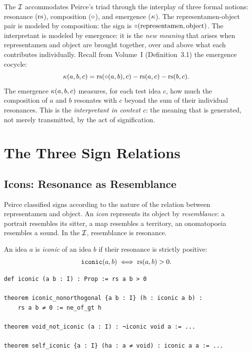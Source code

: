 The $\mathcal{I}$ accommodates Peirce's triad through the interplay of three
formal notions: resonance ($\mathrm{rs}$), composition ($\circ$), and
emergence ($\kappa$). The representamen-object pair is modeled by
composition: the sign is $\circ(\text{representamen}, \text{object})$.
The interpretant is modeled by emergence: it is the \emph{new meaning}
that arises when representamen and object are brought together, over
and above what each contributes individually. Recall from Volume~I
(Definition~3.1) the emergence cocycle:
\[
  \kappa(a, b, c) = \mathrm{rs}(\circ(a, b), c) - \mathrm{rs}(a, c) - \mathrm{rs}(b, c).
\]
The emergence $\kappa(a, b, c)$ measures, for each test idea $c$, how
much the composition of $a$ and $b$ resonates with $c$ beyond the sum
of their individual resonances. This is the \emph{interpretant in
context $c$}: the meaning that is generated, not merely transmitted,
by the act of signification.

\section{The Three Sign Relations}

\subsection{Icons: Resonance as Resemblance}

Peirce classified signs according to the nature of the relation between
representamen and object. An \emph{icon} represents its object by
\emph{resemblance}: a portrait resembles its sitter, a map resembles
a territory, an onomatopoeia resembles a sound. In the $\mathcal{I}$, resemblance
is resonance.

\begin{definition}
\label{def:iconic}
An idea $a$ is \emph{iconic} of an idea $b$ if their resonance is
strictly positive:
\[
  \texttt{iconic}(a, b) \iff \mathrm{rs}(a, b) > 0.
\]
\end{definition}

\begin{lstlisting}[caption={Iconic relation and its consequences}]
def iconic (a b : I) : Prop := rs a b > 0

theorem iconic_nonorthogonal {a b : I} (h : iconic a b) :
    rs a b ≠ 0 := ne_of_gt h

theorem void_not_iconic (a : I) : ¬iconic void a := ...

theorem self_iconic {a : I} (ha : a ≠ void) : iconic a a := ...
\end{lstlisting}

